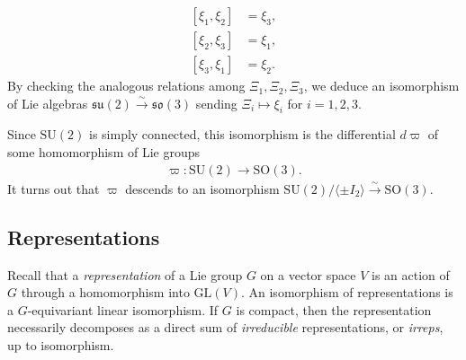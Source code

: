 \documentclass[a4paper,10pt,leqno]{article}
\numberwithin{equation}{section}
\theoremstyle{plain}
\theoremstyle{definition}
\theoremstyle{remark}
\newcommand{\fr}{\mathfrak}
\newcommand{\sapphire}[1]{\textcolor{sapphire}{#1}}
\newcommand{\dfemph}[1]{\sapphire{\emph{#1}}}
\newcommand{\GL}{\mathrm{GL}}
\newcommand{\SU}{\mathrm{SU}}
\newcommand{\SO}{\mathrm{SO}}
\begin{document}
\begin{align} 
{[\xi_1, \xi_2]} &= \xi_3,\\
{[\xi_2, \xi_3]} &= \xi_1,\\
{[\xi_3, \xi_1]} &= \xi_2.
\end{align} 
By checking the analogous relations among $\Xi_1, \Xi_2, \Xi_3$, we deduce an isomorphism of Lie algebras $\fr{su}(2) \xrightarrow{\sim} \fr{so}(3)$ sending $\Xi_i \mapsto \xi_i$ for $i = 1, 2, 3$.

Since $\SU(2)$ is simply connected, this isomorphism is the differential $d\varpi$ of some homomorphism of Lie groups 
\begin{align} 
	\varpi \colon \SU(2) \to \SO(3).
\end{align} 
It turns out that $\varpi$ descends to an isomorphism $\SU(2)/\langle \pm I_2\rangle \xrightarrow{\sim} \SO(3)$.

\subsection{Representations}\label{subsec:reps}

Recall that a \dfemph{representation} of a Lie group $G$ on a vector space $V$ is an action of $G$ through a homomorphism into $\GL(V)$.
An isomorphism of representations is a $G$-equivariant linear isomorphism.
If $G$ is compact, then the representation necessarily decomposes as a direct sum of \emph{irreducible} representations, or \dfemph{irreps}, up to isomorphism.
\end{document}
